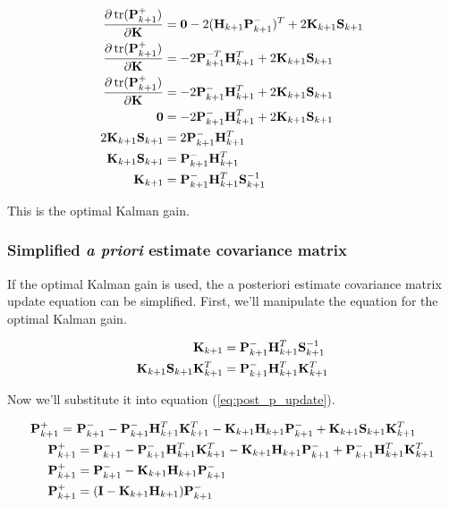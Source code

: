 \begin{align*}
  \frac{\partial\operatorname{tr}(\mathbf{P}_{k+1}^+)}{\partial\mathbf{K}} &=
    \mathbf{0} - 2(\mathbf{H}_{k+1}\mathbf{P}_{k+1}^-)^T + 2\mathbf{K}_{k+1}\mathbf{S}_{k+1} \\
  \frac{\partial\operatorname{tr}(\mathbf{P}_{k+1}^+)}{\partial\mathbf{K}} &=
    -2\mathbf{P}_{k+1}^{-T}\mathbf{H}_{k+1}^T + 2\mathbf{K}_{k+1}\mathbf{S}_{k+1} \\
  \frac{\partial\operatorname{tr}(\mathbf{P}_{k+1}^+)}{\partial\mathbf{K}} &=
    -2\mathbf{P}_{k+1}^-\mathbf{H}_{k+1}^T + 2\mathbf{K}_{k+1}\mathbf{S}_{k+1} \\
  \mathbf{0} &= -2\mathbf{P}_{k+1}^-\mathbf{H}_{k+1}^T + 2\mathbf{K}_{k+1}\mathbf{S}_{k+1} \\
  2\mathbf{K}_{k+1}\mathbf{S}_{k+1} &= 2\mathbf{P}_{k+1}^-\mathbf{H}_{k+1}^T \\
  \mathbf{K}_{k+1}\mathbf{S}_{k+1} &= \mathbf{P}_{k+1}^-\mathbf{H}_{k+1}^T \\
  \mathbf{K}_{k+1} &= \mathbf{P}_{k+1}^-\mathbf{H}_{k+1}^T\mathbf{S}_{k+1}^{-1}
\end{align*}

This is the optimal Kalman gain.

\subsubsection{Simplified \textit{a priori} estimate covariance matrix}

If the optimal Kalman gain is used, the a posteriori estimate covariance matrix
update equation can be simplified. First, we'll manipulate the equation for the
optimal Kalman gain.

\begin{align*}
  \mathbf{K}_{k+1} &= \mathbf{P}_{k+1}^-\mathbf{H}_{k+1}^T\mathbf{S}_{k+1}^{-1} \\
  \mathbf{K}_{k+1}\mathbf{S}_{k+1}\mathbf{K}_{k+1}^T &=
    \mathbf{P}_{k+1}^-\mathbf{H}_{k+1}^T\mathbf{K}_{k+1}^T
\end{align*}

Now we'll substitute it into equation (\ref{eq:post_p_update}).

\begin{align*}
  \mathbf{P}_{k+1}^+ =~&
    \mathbf{P}_{k+1}^- - \mathbf{P}_{k+1}^-\mathbf{H}_{k+1}^T\mathbf{K}_{k+1}^T -
    \mathbf{K}_{k+1}\mathbf{H}_{k+1}\mathbf{P}_{k+1}^- +
    \mathbf{K}_{k+1}\mathbf{S}_{k+1}\mathbf{K}_{k+1}^T \\
  \mathbf{P}_{k+1}^+ &=
    \mathbf{P}_{k+1}^- - \mathbf{P}_{k+1}^-\mathbf{H}_{k+1}^T\mathbf{K}_{k+1}^T -
    \mathbf{K}_{k+1}\mathbf{H}_{k+1}\mathbf{P}_{k+1}^- +
    \mathbf{P}_{k+1}^-\mathbf{H}_{k+1}^T\mathbf{K}_{k+1}^T \\
  \mathbf{P}_{k+1}^+ &= \mathbf{P}_{k+1}^- -
    \mathbf{K}_{k+1}\mathbf{H}_{k+1}\mathbf{P}_{k+1}^- \\
  \mathbf{P}_{k+1}^+ &= (\mathbf{I} - \mathbf{K}_{k+1}\mathbf{H}_{k+1})\mathbf{P}_{k+1}^-
\end{align*}

